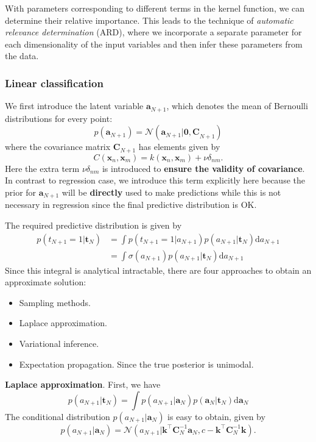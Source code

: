 \documentclass[a4paper]{report}
\newcommand{\ud}{\mathrm{d}}
\renewcommand{\bf}{\mathbf}
\renewcommand{\cal}{\mathcal}
\newcommand{\imp}[1]{{\color{blue}\textit{#1}}}
\begin{document}
With parameters corresponding to different terms in the kernel function, we can determine their relative importance. This leads to the technique of \imp{automatic relevance determination} (ARD), where we incorporate a separate parameter for each dimensionality of the input variables and then infer these parameters from the data.
\subsubsection{Linear classification}
We first introduce the latent variable $\bf{a}_{N+1}$, which denotes the mean of Bernoulli distributions for every point:
\begin{equation}
	p(\bf{a}_{N+1}) = \cal{N}(\bf{a}_{N+1}|\bf{0,C}_{N+1})
\end{equation}
where the covariance matrix $\bf{C}_{N+1}$ has elements given by
\begin{equation}
	C(\bf{x}_n,\bf{x}_m) = k(\bf{x}_n,\bf{x}_m) + \nu \delta_{nm}.
\end{equation}
Here the extra term $\nu \delta_{nm}$ is introduced to \textbf{ensure the validity of covariance}. In contrast to regression case, we introduce this term explicitly here because the prior for $\bf{a}_{N+1}$ will be \textbf{directly} used to make predictions while this is not necessary in regression since the final predictive distribution is OK.

The required predictive distribution is given by
\begin{align}
	p(t_{N+1} = 1|\bf{t}_N) &= \int p(t_{N+1} = 1|a_{N+1})p(a_{N+1}|\bf{t}_N) \ud a_{N+1}\\
	&=  \int \sigma(a_{N+1}) p(a_{N+1}|\bf{t}_N) \ud a_{N+1}
\end{align}
Since this integral is analytical intractable, there are four approaches to obtain an approximate solution:
\begin{itemize}
	\item Sampling methods.
	\item Laplace approximation.
	\item Variational inference.
	\item Expectation propagation. Since the true posterior is unimodal.
\end{itemize}

\textbf{Laplace approximation}. First, we have
\begin{equation}
	p(a_{N+1}|\bf{t}_N) = \int p(a_{N+1}|\bf{a}_N)p(\bf{a}_N|\bf{t}_N) \ud \bf{a}_N
\end{equation}
The conditional distribution $p(a_{N+1}|\bf{a}_N)$ is easy to obtain, given by
\begin{equation}
	p(a_{N+1}|\bf{a}_N) = \cal{N}(a_{N+1}|\bf{k}^{\intercal} \bf{C}_N^{-1}\bf{a}_N, c-\bf{k}^{\intercal}\bf{C}_N^{-1}\bf{k}).
\end{equation}
\end{document}
